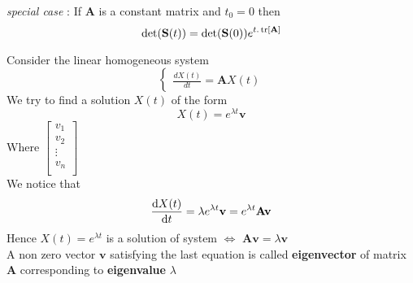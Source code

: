 \documentclass[]{article}
\begin{document}
\textit{special case} :
If $\mathbf{A}$ is a constant matrix and $t_0=0$ then
\[
    \det(\mathbf{S}(t)) = \det(\mathbf{S}(0))e^{t.\trace[\mathbf{A}]}
\]

Consider the linear homogeneous system
\begin{equation}
    \begin{cases}
        \displaystyle \frac{dX(t)}{dt} = \mathbf{A}X(t)
    \end{cases}
\end{equation}
We try to find a solution $X(t)$ of the form
$$X(t) = e^{\lambda t} \mathbf{v}$$
Where $
    \begin{bmatrix}
        v_{1}  \\
        v_{2}  \\
        \vdots \\
        v_{n}  \\
    \end{bmatrix}
$\\
We notice that
$$\dv{X(t)}{t} = \lambda e^{\lambda t} \mathbf{v} = e^{\lambda t}\mathbf{A}\mathbf{v}$$
Hence $X(t)=e^{\lambda t}$ is a solution of system $\iff$ $\mathbf{A}\mathbf{v}=\lambda \mathbf{v}$\\
A non zero vector $\mathbf{v}$ satisfying the last equation is called \textbf{eigenvector} of matrix $\mathbf{A}$ corresponding to \textbf{eigenvalue} $\lambda$\\
\end{document}
